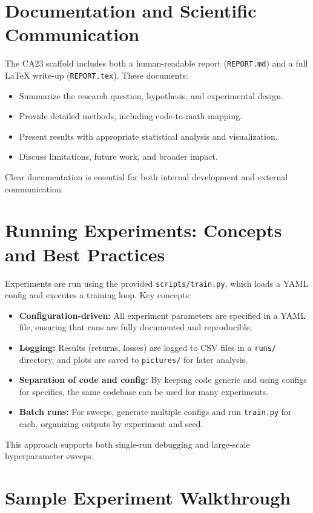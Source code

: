 \documentclass[11pt]{article}
\begin{document}
\section{Documentation and Scientific Communication}
The CA23 scaffold includes both a human-readable report (\texttt{REPORT.md}) and a full LaTeX write-up (\texttt{REPORT.tex}). These documents:
\begin{itemize}
  \item Summarize the research question, hypothesis, and experimental design.
  \item Provide detailed methods, including code-to-math mapping.
  \item Present results with appropriate statistical analysis and visualization.
  \item Discuss limitations, future work, and broader impact.
\end{itemize}
Clear documentation is essential for both internal development and external communication.

\section{Running Experiments: Concepts and Best Practices}
Experiments are run using the provided \texttt{scripts/train.py}, which loads a YAML config and executes a training loop. Key concepts:
\begin{itemize}
  \item \textbf{Configuration-driven:} All experiment parameters are specified in a YAML file, ensuring that runs are fully documented and reproducible.
  \item \textbf{Logging:} Results (returns, losses) are logged to CSV files in a \texttt{runs/} directory, and plots are saved to \texttt{pictures/} for later analysis.
  \item \textbf{Separation of code and config:} By keeping code generic and using configs for specifics, the same codebase can be used for many experiments.
  \item \textbf{Batch runs:} For sweeps, generate multiple configs and run \texttt{train.py} for each, organizing outputs by experiment and seed.
\end{itemize}
This approach supports both single-run debugging and large-scale hyperparameter sweeps.

\section{Sample Experiment Walkthrough}
\end{document}
